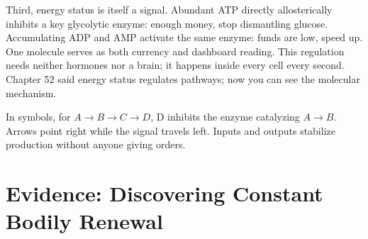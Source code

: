 Third, energy status is itself a signal. Abundant ATP directly allosterically inhibits a key glycolytic enzyme: enough money, stop dismantling glucose. Accumulating ADP and AMP activate the same enzyme: funds are low, speed up. One molecule serves as both currency and dashboard reading. This regulation needs neither hormones nor a brain; it happens inside every cell every second. Chapter 52 said energy status regulates pathways; now you can see the molecular mechanism.

In symbols, for $A \rightarrow B \rightarrow C \rightarrow D$, D inhibits the enzyme catalyzing $A \rightarrow B$. Arrows point right while the signal travels left. Inputs and outputs stabilize production without anyone giving orders.

\section{Evidence: Discovering Constant Bodily Renewal}

